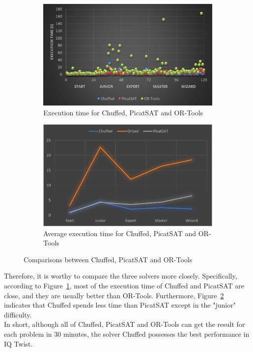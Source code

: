 \begin{figure}[H]
\centering
\begin{subfigure}[b]{.48\textwidth}
\centering
\includegraphics[width=\textwidth]{figs/threesolverpoints.png}
\caption{Execution time for Chuffed, PicatSAT and OR-Tools}
\label{fig:3solvers1}
\end{subfigure}
\begin{subfigure}[b]{.48\textwidth}
\centering
\includegraphics[width=\textwidth]{figs/Three comparison.png}
\caption{Average execution time for Chuffed, PicatSAT and OR-Tools}
\label{fig:3comparison}
\end{subfigure}
\caption{Comparisons between Chuffed, PicatSAT and OR-Tools}
\label{fig:3comparisonsssss}
\end{figure}
Therefore, it is worthy to compare the three solvers more closely. Specifically, according to Figure~\ref{fig:3solvers1}, most of the execution time of Chuffed and PicatSAT are close, and they are usually better than OR-Tools.
Furthermore, Figure~\ref{fig:3comparison} indicates that Chuffed spends less time than PicatSAT except in the "junior" difficulty.
\\In short, although all of Chuffed, PicatSAT and OR-Tools can get the result for each problem in 30 minutes, the solver Chuffed possesses the best performance in IQ Twist.

